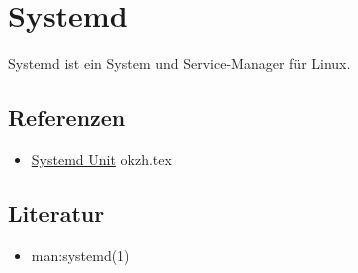 \documentclass{sajzk}
\begin{document}
\section{Systemd}
\label{gjxh}

Systemd ist ein System und Service-Manager für Linux.

\subsection{Referenzen}

\begin{itemize}
    \item \href{okzh.pdf}{Systemd Unit} okzh.tex
\end{itemize}

\subsection{Literatur}

\begin{itemize}
    \item man:systemd(1)
\end{itemize}
\end{document}
